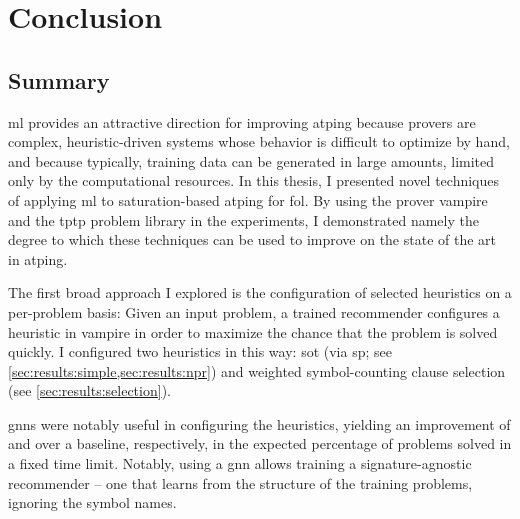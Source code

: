 \chapter{Conclusion}



\section{Summary}


\Gls{ml} provides an attractive direction for improving \gls{atping} because provers are complex, heuristic-driven systems whose behavior is difficult to optimize by hand,
and because typically, training data can be generated in large amounts, limited only by the computational resources.
In this thesis,
I presented novel techniques of applying \gls{ml} to saturation-based \gls{atping} for \gls{fol}.
By using the prover \gls{vampire} and the \gls{tptp} problem library in the experiments,
I demonstrated namely the degree to which these techniques can be used to improve on the state of the art in \gls{atping}.

The first broad approach I explored is the configuration of selected heuristics on a per-problem basis:
Given an input problem, a trained recommender configures a heuristic in \gls{vampire} in order to maximize the chance that the problem is solved quickly.
I configured two heuristics in this way:
\gls{sot} (via \gls{sp}; see \cref{sec:results:simple,sec:results:npr}) and weighted symbol-counting clause selection (see \cref{sec:results:selection}).

\Glspl{gnn} were notably useful in configuring the heuristics,
yielding an improvement of  and  over a baseline, respectively, in the expected percentage of problems solved in a fixed time limit.
Notably, using a \gls{gnn} allows training a signature-agnostic recommender -- one that learns from the structure of the training problems, ignoring the symbol names.

